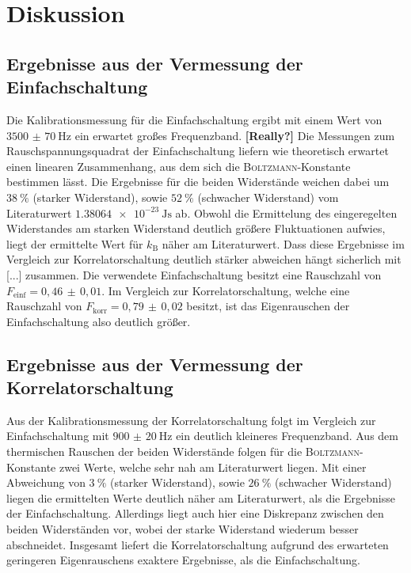 \section{Diskussion}
\label{sec:diskussion}

\subsection{Ergebnisse aus der Vermessung der Einfachschaltung}

Die Kalibrationsmessung für die Einfachschaltung ergibt mit einem Wert von
$\SI{3500(70)}{\hertz}$ ein erwartet großes Frequenzband. \textbf{[Really?]}
Die Messungen zum Rauschspannungsquadrat der Einfachschaltung liefern wie
theoretisch erwartet einen linearen Zusammenhang, aus dem sich die
\textsc{Boltzmann}-Konstante bestimmen lässt. Die Ergebnisse für die beiden
Widerstände weichen dabei um $\SI{38}{\percent}$ (starker Widerstand), sowie
$\SI{52}{\percent}$ (schwacher Widerstand) vom Literaturwert
$\SI{1.38064e-23}{\joule\second}$\cite{CODATA} ab. Obwohl die Ermittelung des
eingeregelten Widerstandes am starken Widerstand deutlich größere Fluktuationen
aufwies, liegt der ermittelte Wert für $k_\text{B}$ näher am Literaturwert. Dass
diese Ergebnisse im Vergleich zur Korrelatorschaltung deutlich stärker abweichen
hängt sicherlich mit [...] zusammen.
Die verwendete Einfachschaltung besitzt eine Rauschzahl von
$F_\text{einf}=0,46\,\pm\,0,01$. Im Vergleich zur Korrelatorschaltung, welche
eine Rauschzahl von $F_\text{korr}=0,79\,\pm\,0,02$ besitzt, ist das
Eigenrauschen der Einfachschaltung also deutlich größer.

\subsection{Ergebnisse aus der Vermessung der Korrelatorschaltung}

Aus der Kalibrationsmessung der Korrelatorschaltung folgt im Vergleich zur
Einfachschaltung mit $\SI{900(20)}{\hertz}$ ein deutlich kleineres Frequenzband.
Aus dem thermischen Rauschen der beiden Widerstände folgen für die
\textsc{Boltzmann}-Konstante zwei Werte, welche sehr nah am Literaturwert
liegen. Mit einer Abweichung von $\SI{3}{\percent}$ (starker Widerstand), sowie
$\SI{26}{\percent}$ (schwacher Widerstand) liegen die ermittelten Werte deutlich
näher am Literaturwert, als die Ergebnisse der Einfachschaltung. Allerdings
liegt auch hier eine Diskrepanz zwischen den beiden Widerständen vor, wobei der
starke Widerstand wiederum besser abschneidet. Insgesamt liefert die
Korrelatorschaltung aufgrund des erwarteten geringeren Eigenrauschens exaktere
Ergebnisse, als die Einfachschaltung.

